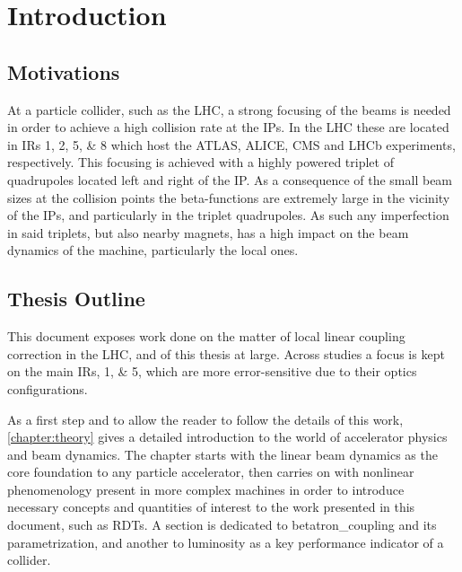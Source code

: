 \chapter{Introduction}
\label{chapter:introduction}


\section{Motivations}

At a particle collider, such as the \acrfull{LHC}, a strong focusing of the \glspl{beam} is needed in order to achieve a high collision rate at the \glspl{IP}.
In the LHC these are located in \glspl{IR} \numlist{1;2;5;8} which host the \acrshort{ATLAS}, \acrshort{ALICE}, \acrshort{CMS} and \acrshort{LHCb} \glspl{experiment}, respectively.
This focusing is achieved with a highly powered \gls{triplet} of quadrupoles located left and right of the IP.
As a consequence of the small beam sizes at the collision points the \glspl{beta-function} are extremely large in the vicinity of the IPs, and particularly in the triplet quadrupoles.
As such any imperfection in said triplets, but also nearby magnets, has a high impact on the beam dynamics of the machine, particularly the local ones.





\section{Thesis Outline}

This document exposes work done on the matter of local linear coupling correction in the LHC, and of this thesis at large.
Across studies a focus is kept on the main \glspl{IR}, \numlist{1;5}, which are more error-sensitive due to their optics configurations.

As a first step and to allow the reader to follow the details of this work, \cref{chapter:theory} gives a detailed introduction to the world of accelerator physics and beam dynamics.
The chapter starts with the linear beam dynamics as the core foundation to any particle accelerator, then carries on with nonlinear phenomenology present in more complex machines in order to introduce necessary concepts and quantities of interest to the work presented in this document, such as \glspl{RDT}.
A section is dedicated to \gls{betatron_coupling} and its parametrization, and another to \gls{luminosity} as a key performance indicator of a collider.

